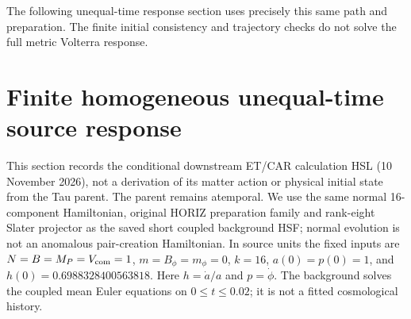 \documentclass[11pt]{article}
\begin{document}
The following unequal-time response section uses precisely this same path and preparation. The finite initial consistency and trajectory checks do not solve the full metric Volterra response.


\section{Finite homogeneous unequal-time source response}
\label{sec:finite-retarded-source}
This section records the conditional downstream ET/CAR calculation HSL
(10 November 2026), not a derivation of its matter action or physical initial
state from the Tau parent. The parent remains atemporal. We use the same
normal 16-component Hamiltonian, original HORIZ preparation family and
rank-eight Slater projector as the saved short coupled background HSF;
normal evolution is not an anomalous pair-creation Hamiltonian.
In source units the fixed inputs are
$N=B=M_P=V_{\rm com}=1$, $m=B_\phi=m_\phi=0$, $k=16$,
$a(0)=p(0)=1$, and $h(0)=0.6988328400563818$.
Here $h=\dot a/a$ and $p=\dot\phi$.
The background solves the coupled mean Euler equations on $0\leq t\leq0.02$;
it is not a fitted cosmological history.
\end{document}
